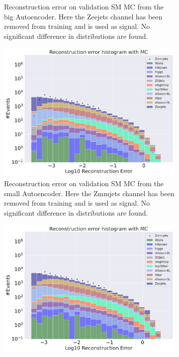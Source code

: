 \begin{figure}[H]
\begin{subfigure}{.45\textwidth}
        \caption{Reconstruction error on validation SM MC from the big Autoencoder. Here the Zeejets channel has been removed from training and 
        is used as signal. No significant difference in distributions are found. }
        \label{fig:ae_big_Zeejets}
    \end{subfigure}
    \hfill 
    \begin{subfigure}{.45\textwidth}
        \includegraphics[width=\textwidth]{Figures/AE_testing/small/b_data_recon_big_rm3_feats_sig_Zmmjets.pdf}
        \caption{Reconstruction error on validation SM MC from the small Autoencoder. Here the Zmmjets channel has been removed from training and 
        is used as signal. No significant difference in distributions are found. }
        \label{fig:ae_small_Zmmjets}
    \end{subfigure}
    \hfill
    \begin{subfigure}{.45\textwidth}
        \includegraphics[width=\textwidth]{Figures/AE_testing/big/b_data_recon_big_rm3_feats_sig_Zmmjets.pdf}

\end{subfigure}
\end{figure}
